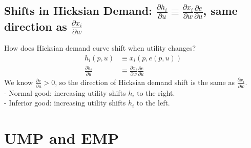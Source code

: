 \documentclass[11pt]{elegantbook}
\begin{document}
\subsection{Shifts in Hicksian Demand: $\frac{\partial h_{i}}{\partial u}  \equiv \frac{\partial x_{i}}{\partial w} \frac{\partial e}{\partial u}$, same direction as $\frac{\partial x_{i}}{\partial w}$}
How does Hicksian demand curve shift when utility changes?
$$
\begin{aligned}
h_{i}(p, u) & \equiv x_{i}(p, e(p, u)) \\
\frac{\partial h_{i}}{\partial u} & \equiv \frac{\partial x_{i}}{\partial w} \frac{\partial e}{\partial u}
\end{aligned}
$$
We know $\frac{\partial e}{\partial u}>0$, so the direction of Hicksian demand shift is the same as $\frac{\partial x_{i}}{\partial w}$.\\
- Normal good: increasing utility shifts $h_{i}$ to the right.\\
- Inferior good: increasing utility shifts $h_{i}$ to the left.

\section{UMP and EMP}
\end{document}
